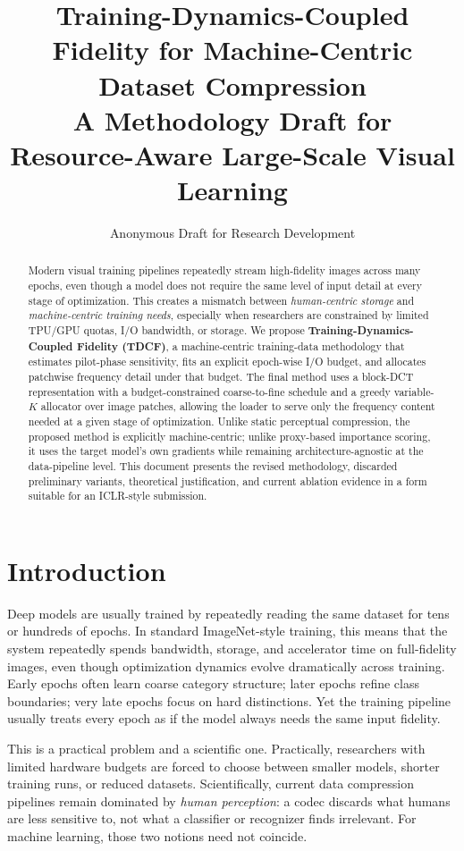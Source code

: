 \documentclass[10pt,twocolumn]{article}
\title{Training-Dynamics-Coupled Fidelity for Machine-Centric Dataset Compression\\
\large A Methodology Draft for Resource-Aware Large-Scale Visual Learning}
\author{Anonymous Draft for Research Development}
\date{}
\begin{document}
\maketitle

\begin{abstract}
Modern visual training pipelines repeatedly stream high-fidelity images across many epochs, even though a model does not require the same level of input detail at every stage of optimization. This creates a mismatch between \emph{human-centric storage} and \emph{machine-centric training needs}, especially when researchers are constrained by limited TPU/GPU quotas, I/O bandwidth, or storage. We propose \textbf{Training-Dynamics-Coupled Fidelity (TDCF)}, a machine-centric training-data methodology that estimates pilot-phase sensitivity, fits an explicit epoch-wise I/O budget, and allocates patchwise frequency detail under that budget. The final method uses a block-DCT representation with a budget-constrained coarse-to-fine schedule and a greedy variable-$K$ allocator over image patches, allowing the loader to serve only the frequency content needed at a given stage of optimization. Unlike static perceptual compression, the proposed method is explicitly machine-centric; unlike proxy-based importance scoring, it uses the target model's own gradients while remaining architecture-agnostic at the data-pipeline level. This document presents the revised methodology, discarded preliminary variants, theoretical justification, and current ablation evidence in a form suitable for an ICLR-style submission.
\end{abstract}

\section{Introduction}
Deep models are usually trained by repeatedly reading the same dataset for tens or hundreds of epochs. In standard ImageNet-style training, this means that the system repeatedly spends bandwidth, storage, and accelerator time on full-fidelity images, even though optimization dynamics evolve dramatically across training. Early epochs often learn coarse category structure; later epochs refine class boundaries; very late epochs focus on hard distinctions. Yet the training pipeline usually treats every epoch as if the model always needs the same input fidelity.

This is a practical problem and a scientific one. Practically, researchers with limited hardware budgets are forced to choose between smaller models, shorter training runs, or reduced datasets. Scientifically, current data compression pipelines remain dominated by \emph{human perception}: a codec discards what humans are less sensitive to, not what a classifier or recognizer finds irrelevant. For machine learning, those two notions need not coincide.
\end{document}

